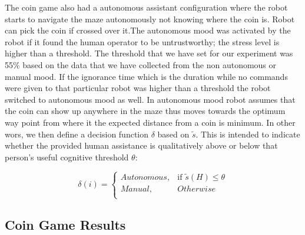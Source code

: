 \documentclass{sig-alternate}
\begin{document}
The coin game also had a autonomous assistant configuration where the robot starts to navigate the maze autonomously not knowing where the coin is. Robot can pick the coin if crossed over it.The autonomous mood was activated by the robot if it found the human operator to be untrustworthy; the stress level is higher than a threshold. The threshold that we have set for our experiment was 55\% based on the data that we have collected from the non autonomous or manual mood. If the ignorance time which is the duration while no commands were given to that particular robot was higher than a threshold the robot switched to autonomous mood as well. In autonomous mood robot assumes that the coin can show up anywhere in the maze thus moves towards the optimum way point from where it the expected distance from a coin is minimum. In other wors, we then define a decision function $\delta$ based on $\tilde{s}$.  This is intended to indicate whether the provided human assistance is qualitatively above or below that person's useful cognitive threshold $\theta$:

\[
\delta(i) = 
\begin{cases}
Autonomous, & \text{if } \tilde{s}(H)\le \theta\\
Manual, & Otherwise\\
\end{cases}
\]
 

\subsection{Coin Game Results}
\end{document}
